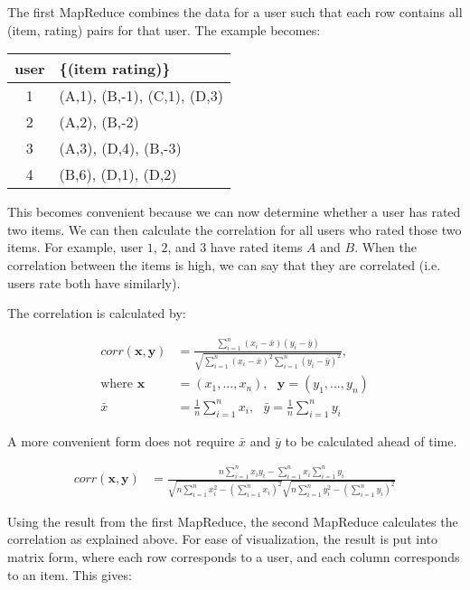 \documentclass{article}
\begin{document}
The first MapReduce combines the data for a user such that each row contains all (item, rating) pairs for that user. The example becomes:

\begin{center}
\begin{tabular}{|c|l|}
\hline
user & \{(item rating)\}\\
\hline
1 & (A,1), (B,-1), (C,1), (D,3) \\
2 & (A,2), (B,-2)\\
3 & (A,3), (D,4), (B,-3)\\
4 & (B,6), (D,1), (D,2)\\
\hline
\end{tabular}
\end{center}

This becomes convenient because we can now determine whether a user has rated two items. We can then calculate the correlation for all users who rated those two items. For example, user $1$, $2$, and $3$ have rated items $A$ and $B$. When the correlation between the items is high, we can say that they are correlated (i.e. users rate both have similarly).

The correlation is calculated by:

\begin{align*}
corr(\textbf{x},\textbf{y})&=\frac{\sum\limits_{i=1}^n(x_i-\bar{x})(y_i-\bar{y})}{\sqrt{\sum\limits_{i=1}^n(x_i-\bar{x})^2\sum\limits_{i=1}^n(y_i-\bar{y})^2}},\\
\text{where } \textbf{x}&=(x_1, ..., x_n),\text{ } \textbf{y}=(y_1, ..., y_n)\\
\bar{x}&=\frac{1}{n}\sum\limits_{i=1}^nx_i,\text{ } \bar{y}=\frac{1}{n}\sum\limits_{i=1}^ny_i
\end{align*}

A more convenient form does not require $\bar{x}$ and $\bar{y}$ to be calculated ahead of time.

\begin{align}
corr(\textbf{x},\textbf{y})&=\frac{n\sum\limits_{i=1}^nx_iy_i - \sum\limits_{i=1}^nx_i\sum\limits_{i=1}^ny_i}{\sqrt{n\sum\limits_{i=1}^nx_i^2-(\sum\limits_{i=1}^nx_i)^2}\sqrt{n\sum\limits_{i=1}^ny_i^2-(\sum\limits_{i=1}^ny_i)^2}}
\end{align}

Using the result from the first MapReduce, the second MapReduce calculates the correlation as explained above. For ease of visualization, the result is put into matrix form, where each row corresponds to a user, and each column corresponds to an item. This gives:
\end{document}
